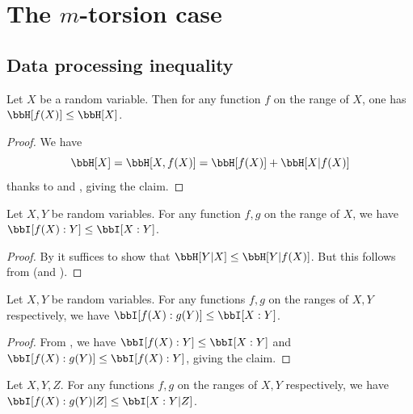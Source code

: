 \chapter{The \texorpdfstring{$m$}{m}-torsion case}

\section{Data processing inequality}

\begin{lemma}\label{data-process-single}\leanok  Let $X$ be a random variable.  Then for any function $f$ on the range of $X$, one has $\bbH[f(X)] \leq \bbH[X]$.
\end{lemma}

\begin{proof}\leanok
We have
$$ \bbH[X] = \bbH[X,f(X)] = \bbH[f(X)] + \bbH[X|f(X)]$$
thanks to  and , giving the claim.
\end{proof}

\begin{lemma}\label{data-process-unc-one}\leanok Let $X,Y$ be random variables. For any function $f, g$ on the range of $X$, we have $\bbI[f(X) : Y] \leq \bbI[X:Y]$.
\end{lemma}

\begin{proof}\leanok
  By  it suffices to show that $\bbH[Y|X] \leq \bbH[Y|f(X)]$. But this follows from  (and ).
\end{proof}

\begin{lemma}\label{data-process-unc}\leanok Let $X,Y$ be random variables. For any functions $f, g$ on the ranges of $X, Y$ respectively, we have $\bbI[f(X) : g(Y )] \leq \bbI[X : Y]$.
\end{lemma}

\begin{proof}\leanok
   From ,  we have $\bbI[f(X) : Y] \leq \bbI[X:Y]$ and $\bbI[f(X): g(Y)] \leq \bbI[f(X):Y]$, giving the claim.
\end{proof}

\begin{lemma}\label{data-process}\leanok Let $X,Y,Z$. For any functions $f, g$
on the ranges of $X, Y$ respectively, we have $\bbI[f(X) : g(Y )|Z] \leq \bbI[X :Y |Z]$.
\end{lemma}

